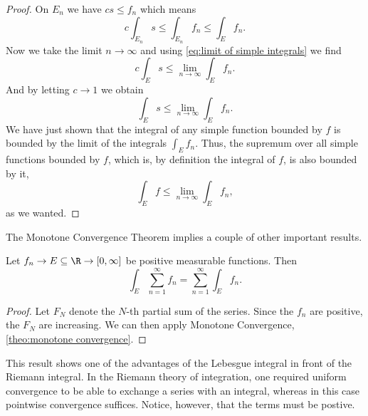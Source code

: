 \documentclass[12pt,oneside]{book}
\begin{document}
\begin{proof}
	On \( E_n \) we have \( cs \leq f_n \) which means
	\begin{equation*}
		c \int_{E_n} s \leq \int_{E_n} f_n \leq \int_{E} f_n.
	\end{equation*}
	Now we take the limit \( n \to \infty \) and using \cref{eq:limit of simple integrals}
	we find 
	\begin{equation*}
		c \int_E s \leq \lim_{n \to \infty} \int_E f_n.
	\end{equation*}
	And by letting \( c \to 1 \) we obtain
	\begin{equation*}
		\int_E s \leq \lim_{n \to \infty} \int_E f_n.
	\end{equation*}
	We have just shown that the integral of any simple function bounded by \( f \) is bounded
	by the limit of the integrals \( \int_E f_n \). Thus, the supremum over all simple
	functions bounded by \( f \), which is, by definition the integral of \( f \), is also
	bounded by it,
	\begin{equation*}
		\int_E f \leq \lim_{n \to \infty} \int_E f_n,
	\end{equation*}
	as we wanted.
\end{proof}

The Monotone Convergence Theorem implies a couple of other important results.
\begin{theorem}
	Let \( f_n \to E \subseteq \R \to [0,\infty] \)	be positive measurable functions. Then
	\begin{equation*}
		\int_E \sum_{n = 1}^{\infty} f_n = \sum_{n = 1}^{\infty} \int_E f_n.  
	\end{equation*}
\end{theorem}
\begin{proof}
	Let \( F_N \) denote the \( N \)-th partial sum of the series. Since the \( f_n \) are positive, the \( F_N \) are increasing. We can then apply Monotone Convergence, \cref{theo:monotone convergence}.
\end{proof}
This result shows one of the advantages of the Lebesgue integral in front of the Riemann integral. In the Riemann theory of integration, one required uniform convergence to be able to exchange a series with an integral, whereas in this case pointwise convergence suffices. Notice, however, that the terms must be postive. 
\end{document}
